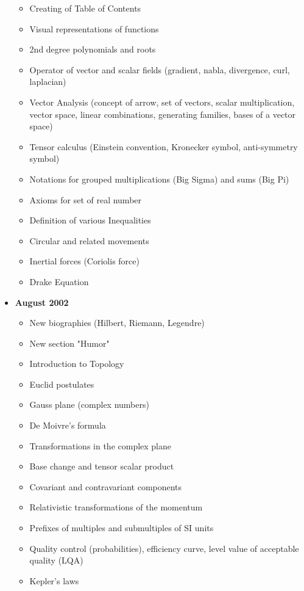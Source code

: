 \documentclass[12pt,a4paper,twoside,openright]{report}
\theoremstyle{definition}
\theoremstyle{itexmp}
\numberwithin{equation}{section}
\begin{document}
\begin{itemize}
			\begin{itemize}[noitemsep]
				\item Creating of Table of Contents
				\item Visual representations of functions
				\item 2nd degree polynomials and roots
				\item Operator of vector and scalar fields (gradient, nabla, divergence, curl, laplacian)
				\item Vector Analysis (concept of arrow, set of vectors, scalar multiplication, vector space, linear combinations, generating families, bases of a vector space)
				\item Tensor calculus (Einstein convention, Kronecker symbol, anti-symmetry symbol)
				\item Notations for grouped multiplications (Big Sigma) and sums (Big Pi)
				\item Axioms for set of real number 
				\item Definition of various Inequalities 
				\item Circular and related movements
				\item Inertial forces (Coriolis force)
				\item Drake Equation
			\end{itemize}
		\pagebreak
		\item \textbf{August 2002}
			\begin{itemize}[noitemsep]
				\item New biographies (Hilbert, Riemann, Legendre)
				\item New section "Humor"
				\item Introduction to Topology
				\item Euclid postulates
				\item Gauss plane (complex numbers)
				\item De Moivre's formula
				\item Transformations in the complex plane
				\item Base change and tensor scalar product
				\item Covariant and contravariant components
				\item Relativistic transformations of the momentum
				\item Prefixes of multiples and submultiples of SI units
				\item Quality control (probabilities), efficiency curve, level value of acceptable quality (LQA)
				\item Kepler's laws

\end{itemize}
\end{itemize}
\end{document}
